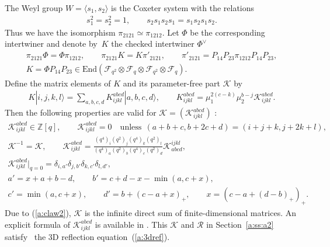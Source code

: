 The Weyl group $W=\langle s_1, s_2 \rangle$ is the Coxeter system
with the relations
\begin{gather*}
s_1^2=s_2^2=1,\qquad
s_2s_1s_2s_1 = s_1s_2s_1s_2.
\end{gather*}
Thus we have the isomorphism
$\pi_{2121} \simeq \pi_{1212}$.
Let $\Phi$ be the corresponding intertwiner and denote by~$K$
the checked intertwiner $\Phi^\vee$
\begin{gather*}
\pi_{2121} \Phi = \Phi  \pi_{1212},\qquad
\pi_{2121} K = K  \pi'_{2121},\qquad
\pi'_{2121} = P_{14}P_{23}\pi_{1212}P_{14}P_{23},\\
K = \Phi P_{14}P_{23} \in
\mathrm{End}(\mathcal{F}_{q^2}\otimes
\mathcal{F}_{q}\otimes
\mathcal{F}_{q^2}\otimes
\mathcal{F}_{q}).
\end{gather*}
Def\/ine the matrix elements of $K$ and its parameter-free part
$\mathscr{K}$ by
\begin{gather*}
K  |i,j,k,l \rangle=
\sum_{a,b,c,d}K^{abcd}_{ijkl}|a,b,c,d \rangle,
\qquad
K^{abcd}_{ijkl}  = \mu_1^{2(c-k)}\mu_2^{b-j}
\mathscr{K}^{abcd}_{ijkl}.
\end{gather*}
Then the following properties are valid for
$\mathscr{K} = (\mathscr{K}^{abcd}_{ijkl})$ \cite{KO1}:
\begin{gather}
\mathscr{K}^{abcd}_{ijkl} \in \mathbb{Z}[q],\qquad
\mathscr{K}^{abcd}_{ijkl}=0 \quad \mathrm{unless}\ \
(a+b+c, b+2c+d)=(i+j+k, j+2k+l),
\label{a:claw2}\\
\mathscr{K}^{-1} = \mathscr{K},\qquad
\mathscr{K}^{a b c d}_{i j k l}
= \frac{(q^4)_i(q^2)_j(q^4)_k(q^2)_l }{(q^4)_a(q^2)_b(q^4)_c(q^2)_d}
\mathscr{K}^{i j k l}_{a b c d},\label{a:kprop}\\
\mathscr{K}^{abcd}_{ijkl}|_{q=0}
= \delta_{i,a'}\delta_{j,b'}\delta_{k,c'}\delta_{l,d'},\label{a:k0}\\
a'=x + a + b - d,\qquad
b'=c + d - x-\min(a,c + x),\nonumber\\
  c'=\min(a,c+x),\qquad
d'= b+(c-a+x)_+,\qquad x=(c-a+(d-b)_+)_+.\nonumber
\end{gather}
Due to (\ref{a:claw2}), $\mathscr{K}$ is the inf\/inite direct sum
of f\/inite-dimensional matrices.
An explicit formula of $\mathscr{K}^{abcd}_{ijkl}$ is available
in \cite[equations~(3.27), (3.28)]{KO1}.
This $\mathscr{K}$ and $\mathscr{R}$ in Section~\ref{a:ss:a2} satisfy~\cite{KO1}
the 3D ref\/lection equation~(\ref{a:3dref}).

